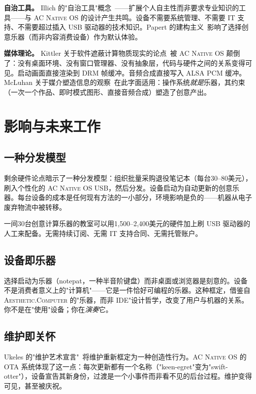 \documentclass[10pt,letterpaper,twocolumn]{article}
\newcommand{\ac}{\textsc{Aesthetic.Computer}}
\newcommand{\acos}{\textsc{AC Native OS}}
\begin{document}
\textbf{自治工具。} Illich 的"自治工具"概念~\citep{illich1973tools}——扩展个人自主性而非要求专业知识的工具——与 \acos{} 的设计产生共鸣。设备不需要系统管理、不需要 IT 支持、不需要超过插入 USB 驱动器的技术知识。Papert 的建构主义~\citep{papert1980mindstorms}影响了选择创意乐器（而非内容消费设备）作为默认体验。

\textbf{媒体理论。} Kittler 关于软件遮蔽计算物质现实的论点~\citep{kittler1995no}被 \acos{} 颠倒了：没有桌面环境、没有窗口管理器、没有抽象层，代码与硬件之间的关系变得可见。启动画面直接渲染到 DRM 帧缓冲。音频合成直接写入 ALSA PCM 缓冲。McLuhan 关于媒介塑造信息的观察~\citep{mcluhan1964understanding}在此字面适用：操作系统\emph{就是}乐器，其约束（一次一个作品、即时模式图形、直接音频合成）塑造了创意产出。


\section{影响与未来工作}
\label{sec:implications}

\subsection{一种分发模型}

剩余硬件论点暗示了一种分发模型：组织批量采购退役笔记本（每台30--80美元），刷入个性化的 \acos{} USB，然后分发。设备启动为自动更新的创意乐器。每台设备的成本是任何现有方法的一小部分，环境影响是负的——机器从电子废弃物流中被转移。

一间30台创意计算乐器的教室可以用1,500--2,400美元的硬件加上刷 USB 驱动器的人工来配备。无需持续订阅、无需 IT 支持合同、无需托管账户。

\subsection{设备即乐器}

选择启动为乐器（notepat，一种半音阶键盘）而非桌面或浏览器是刻意的。设备不是消费者意义上的"计算机"——它是一件恰好可编程的乐器。这种框定，借鉴自 \ac{} 的"乐器，而非 IDE"设计哲学，改变了用户与机器的关系。你不是在"使用"设备；你在\emph{演奏}它。

\subsection{维护即关怀}

Ukeles 的"维护艺术宣言"~\citep{ukeles1969manifesto}将维护重新框定为一种创造性行为。\acos{} 的 OTA 系统体现了这一点：每次更新都有一个名称（"keen-egret"变为"swift-otter"），设备宣告其新身份，过渡是一个小事件而非看不见的后台过程。维护变得可见，甚至被庆祝。
\end{document}
